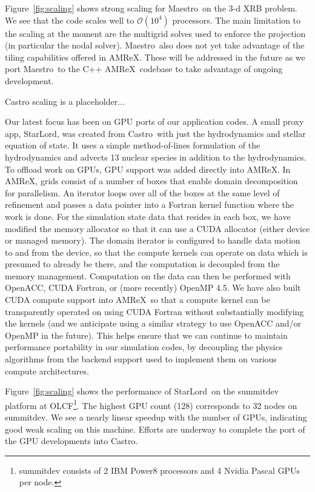 \documentclass[letterpaper]{jpconf}
\newcommand{\maestro}{{\sffamily Maestro}}
\newcommand{\castro}{{\sffamily Castro}}
\newcommand{\starlord}{{\sffamily StarLord}}
\newcommand{\amrex}{{\sffamily AMReX}}
\newcommand{\MarginPar}[1]{\marginpar{\vskip-\baselineskip\raggedright\tiny\sffamily\hrule\smallskip{\color{red}#1}\par\smallskip\hrule}}
\begin{document}
Figure~\ref{fig:scaling} shows strong scaling for \maestro\ on the 3-d
XRB problem.  We see that the code scales well to $\mathcal{O}(10^4)$
processors.  The main limitation to the scaling at the moment are the
multigrid solves used to enforce the projection (in particular the
nodal solver).  \maestro\ also does not yet take advantage of the
tiling capabilities offered in \amrex.  These will be addressed in the
future as we port \maestro\ to the C++ \amrex\ codebase to take advantage
of ongoing development.

Castro scaling is a placeholder...

Our latest focus has been on GPU ports of our application codes.  A
small proxy app, \starlord, was created from \castro\ with just the
hydrodynamics and stellar equation of state.  It uses a simple
method-of-lines formulation of the hydrodynamics and advects 13
nuclear species in addition to the hydrodynamics.  To offload work on
GPUs, GPU support was added directly into \amrex.  In \amrex, grids
consist of a number of boxes that enable domain decomposition for
parallelism.  An iterator loops over all of the boxes at the same
level of refinement and passes a data pointer into a Fortran kernel
function where the work is done. For the simulation state data that
resides in each box, we have modified the memory allocator so that it
can use a CUDA allocator (either device or managed memory).  The
domain iterator is configured to handle data motion to and from the
device, so that the compute kernels can operate on data which is
presumed to already be there, and the computation is decoupled from
the memory management. Computation on the data can then be performed
with OpenACC, CUDA Fortran, or (more recently) OpenMP 4.5. We have
also built CUDA compute support into \amrex\ so that a compute kernel
can be transparently operated on using CUDA Fortran without
substantially modifying the kernels (and we anticipate using a similar
strategy to use OpenACC and/or OpenMP in the future). This helps
ensure that we can continue to maintain performance portability in our
simulation codes, by decoupling the physics algorithms from the
backend support used to implement them on various compute
architectures.\MarginPar{add CPU time for reference}

Figure~\ref{fig:scaling} shows the performance of \starlord\ on the
summitdev platform at OLCF\footnote{summitdev consists of 2 IBM Power8
  processors and 4 Nvidia Pascal GPUs per node.}.  The highest GPU
count (128) corresponds to 32 nodes on summitdev.  We see a nearly
linear speedup with the number of GPUs, indicating good weak scaling
on this machine.  Efforts are underway to complete the port of the GPU
developments into \castro.
\end{document}
